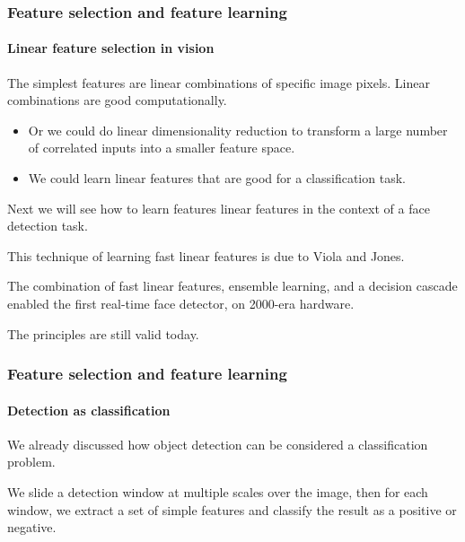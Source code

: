 \documentclass[aspectratio=169]{beamer}
\begin{document}
\begin{frame}
\frametitle{Feature selection and feature learning}
\framesubtitle{Linear feature selection in vision}

The simplest features are \alert{linear combinations} of specific
image pixels.  Linear combinations are good computationally.

\begin{itemize}
\item Or we could do \alert{linear dimensionality reduction} to
  transform a large number of correlated inputs into a smaller feature
  space.
\item We could \alert{learn} linear features that are good for a
  classification task.
\end{itemize}

\medskip

Next we will see how to learn features linear features in the context
of a \alert{face detection} task.

\medskip

This technique of learning fast linear features is due to Viola and
Jones.

\medskip

The combination of fast linear features, ensemble learning, and a decision
cascade enabled the first real-time face detector, on 2000-era hardware.

\medskip

The principles are still valid today.

\end{frame}


\begin{frame}
\frametitle{Feature selection and feature learning}
\framesubtitle{Detection as classification}

We already discussed how \alert{object detection} can be considered a
\alert{classification problem}.

\medskip

We slide a detection window at multiple scales over the image, then
for each window, we extract a set of simple features and classify the
result as a positive or negative.

\end{frame}
\end{document}
